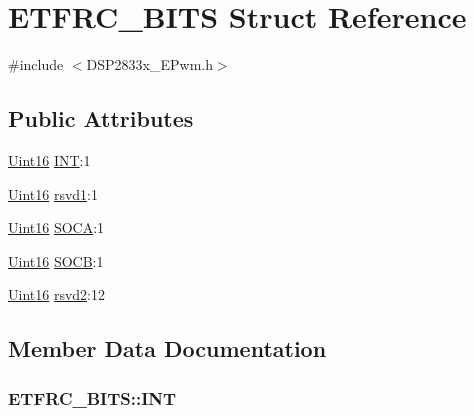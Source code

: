 \hypertarget{struct_e_t_f_r_c___b_i_t_s}{}\section{E\+T\+F\+R\+C\+\_\+\+B\+I\+T\+S Struct Reference}
\label{struct_e_t_f_r_c___b_i_t_s}


{\ttfamily \#include $<$D\+S\+P2833x\+\_\+\+E\+Pwm.\+h$>$}

\subsection*{Public Attributes}
\begin{DoxyCompactItemize}
\item 
\hyperlink{_d_s_p2833x___device_8h_a59a9f6be4562c327cbfb4f7e8e18f08b}{Uint16} \hyperlink{struct_e_t_f_r_c___b_i_t_s_ae1f135106db9a6fdf35739788345d304}{I\+N\+T}\+:1
\item 
\hyperlink{_d_s_p2833x___device_8h_a59a9f6be4562c327cbfb4f7e8e18f08b}{Uint16} \hyperlink{struct_e_t_f_r_c___b_i_t_s_a4e9f74b4a588cc1d6304c53c53a36fe7}{rsvd1}\+:1
\item 
\hyperlink{_d_s_p2833x___device_8h_a59a9f6be4562c327cbfb4f7e8e18f08b}{Uint16} \hyperlink{struct_e_t_f_r_c___b_i_t_s_a1a07c6ec06e2172948ef67d07b854b09}{S\+O\+C\+A}\+:1
\item 
\hyperlink{_d_s_p2833x___device_8h_a59a9f6be4562c327cbfb4f7e8e18f08b}{Uint16} \hyperlink{struct_e_t_f_r_c___b_i_t_s_ad6c61eba7afe447dee0f2d50cde20205}{S\+O\+C\+B}\+:1
\item 
\hyperlink{_d_s_p2833x___device_8h_a59a9f6be4562c327cbfb4f7e8e18f08b}{Uint16} \hyperlink{struct_e_t_f_r_c___b_i_t_s_a06beb0b06a675ceac3abd84354508697}{rsvd2}\+:12
\end{DoxyCompactItemize}


\subsection{Member Data Documentation}
\hypertarget{struct_e_t_f_r_c___b_i_t_s_ae1f135106db9a6fdf35739788345d304}{}
\subsubsection[{I\+N\+T}]{ E\+T\+F\+R\+C\+\_\+\+B\+I\+T\+S\+::\+I\+N\+T}\label{struct_e_t_f_r_c___b_i_t_s_ae1f135106db9a6fdf35739788345d304}
\hypertarget{struct_e_t_f_r_c___b_i_t_s_a4e9f74b4a588cc1d6304c53c53a36fe7}{}
